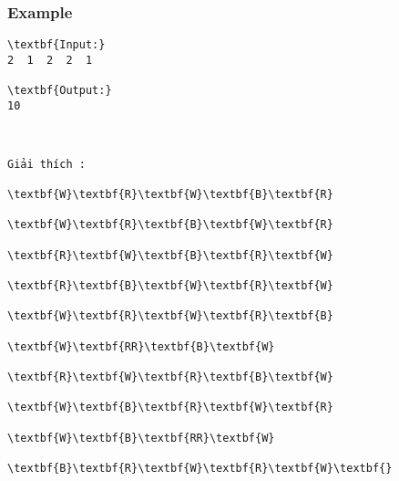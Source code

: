 \subsubsection{   Example  }
\begin{verbatim}
\textbf{Input:}
2  1  2  2  1

\textbf{Output:}
10\end{verbatim}
\begin{verbatim}


Giải thích :

\textbf{W}\textbf{R}\textbf{W}\textbf{B}\textbf{R}

\textbf{W}\textbf{R}\textbf{B}\textbf{W}\textbf{R}

\textbf{R}\textbf{W}\textbf{B}\textbf{R}\textbf{W}

\textbf{R}\textbf{B}\textbf{W}\textbf{R}\textbf{W}

\textbf{W}\textbf{R}\textbf{W}\textbf{R}\textbf{B}

\textbf{W}\textbf{RR}\textbf{B}\textbf{W}

\textbf{R}\textbf{W}\textbf{R}\textbf{B}\textbf{W}

\textbf{W}\textbf{B}\textbf{R}\textbf{W}\textbf{R}

\textbf{W}\textbf{B}\textbf{RR}\textbf{W}

\textbf{B}\textbf{R}\textbf{W}\textbf{R}\textbf{W}\textbf{}\end{verbatim}
